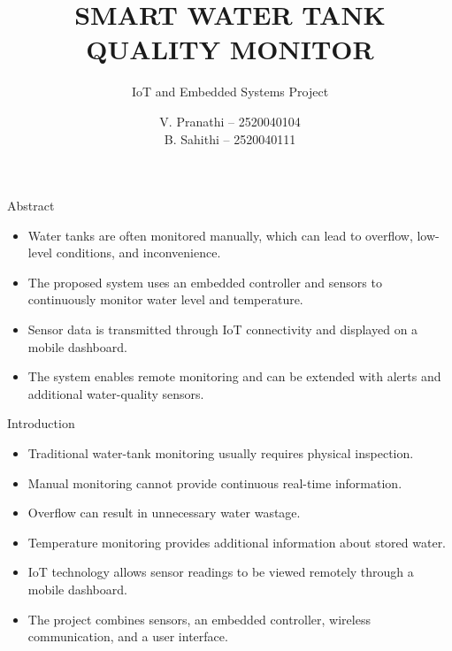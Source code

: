 \documentclass[aspectratio=169]{beamer}
\title[Smart Water Tank Quality Monitor]
{SMART WATER TANK QUALITY MONITOR}
\subtitle{IoT and Embedded Systems Project}
\author{
V. Pranathi -- 2520040104\\
B. Sahithi -- 2520040111
}
\institute{
Department of ECE
}
\date{}
\begin{document}

\begin{frame}
    \titlepage
\end{frame}


\begin{frame}{Abstract}

\begin{itemize}

    \item Water tanks are often monitored manually, which can lead to
    overflow, low-level conditions, and inconvenience.

    \item The proposed system uses an embedded controller and sensors
    to continuously monitor water level and temperature.

    \item Sensor data is transmitted through IoT connectivity and
    displayed on a mobile dashboard.

    \item The system enables remote monitoring and can be extended
    with alerts and additional water-quality sensors.

\end{itemize}

\end{frame}


\begin{frame}{Introduction}

\begin{itemize}

    \item Traditional water-tank monitoring usually requires
    physical inspection.

    \item Manual monitoring cannot provide continuous real-time
    information.

    \item Overflow can result in unnecessary water wastage.

    \item Temperature monitoring provides additional information
    about stored water.

    \item IoT technology allows sensor readings to be viewed
    remotely through a mobile dashboard.

    \item The project combines sensors, an embedded controller,
    wireless communication, and a user interface.

\end{itemize}

\end{frame}
\end{document}
